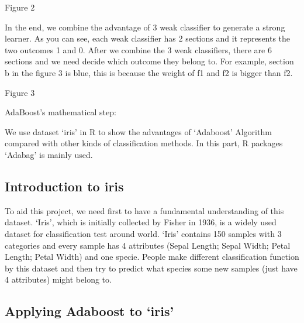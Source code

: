 \documentclass[../SMLreport_template.tex]{subfiles}
\begin{document}
 
Figure 2

In the end, we combine the advantage of 3 weak classifier to generate a strong learner. As you can see, each weak classifier has 2 sections and it represents the two outcomes 1 and 0. After we combine the 3 weak classifiers, there are 6 sections and we need decide which outcome they belong to. For example, section b in the figure 3 is blue, this is because the weight of f1 and f2 is bigger than f2.

	Figure 3

AdaBoost's mathematical step:






















We use dataset ‘iris’ in R to show the advantages of ‘Adaboost’ Algorithm compared with other kinds of classification methods. In this part, R packages ‘Adabag’ is mainly used.\par
\subsection{Introduction to iris}
To aid this project, we need first to have a fundamental understanding of this dataset. ‘Iris’, which is initially collected by Fisher in 1936, is a widely used dataset for classification test around world. ‘Iris’ contains 150 samples with 3 categories and every sample has 4 attributes (Sepal Length; Sepal Width; Petal Length; Petal Width) and one specie. People make different classification function by this dataset and then try to predict what species some new samples (just have 4 attributes) might belong to.\par
\subsection{Applying Adaboost to ‘iris’}
\end{document}
